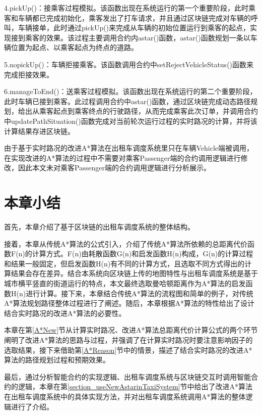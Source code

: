 4.pickUp()：接乘客过程模拟。该函数出现在系统运行的第一个重要阶段，此时乘客和车辆都已完成初始化，乘客发出了打车请求，并且通过区块链完成对车辆的呼叫，车辆接单，此时通过pickUp()来完成从车辆的初始位置运行到乘客的起点，实现接到乘客的效果。该过程主要调用合约内astar()函数，astar()函数规划一条以车辆位置为起点、以乘客起点为终点的道路。

5.nopickUp()：车辆拒接乘客。该函数调用合约中setRejectVehicleStatus()函数来完成拒接效果。

6.manageToEnd()：送乘客过程模拟。该函数出现在系统运行的第二个重要阶段，此时车辆已接到乘客。此过程调用合约中astar()函数，通过区块链完成动态路径规划，给出从乘客起点到乘客终点的行驶路径，从而完成乘客此次订单，并调用合约中updatePathSituation()函数完成对当前轮次运行过程的实时路况的计算，并将该计算结果存进区块链。

由于基于实时路况的改进A*算法在出租车调度系统里只在车辆Vehicle端被调用，在实现改进的A*算法的过程中不需要对乘客Passenger端的合约调用逻辑进行修改，因此本文未对乘客Passenger端的合约调用逻辑进行分析展示。

\section{本章小结}

首先，本章介绍了基于区块链的出租车调度系统的整体结构。

接着，本章从传统A*算法的公式引入，介绍了传统A*算法所依赖的总距离代价函数F(n)的计算方式。F(n)由耗散函数G(n)和启发函数H(n)构成，G(n)的计算过程和结果一般固定，但启发函数H(n)有不同的计算方式，且选取不同方式得出的计算结果会存在差异。结合本系统向区块链上传的地图特性与出租车调度系统是基于城市横平竖直的街道运行的特点，本文最终选取曼哈顿距离作为A*算法的启发函数H(n)进行计算。接下来，本章结合传统A*算法的流程图和简单的例子，对传统A*算法规划路径整体过程进行了阐述。随后，本章根据A*算法的特性给出了设计结合实时路况的改进A*算法的必要性。

本章在第\ref{A*New}节从计算实时路况、改进A*算法总距离代价计算公式的两个环节阐明了改进A*算法的思路与过程，并强调了在计算实时路况时要注意影响因子的选取结果，接下来借助第\ref{A*Reason}节中的情景，描述了结合实时路况的改进A*算法的路径规划过程和预期效果。

最后，通过分析智能合约的实现逻辑、出租车调度系统与区块链交互时调用智能合约的逻辑，本章在第\ref{section_useNewAstarinTaxiSystem}节中给出了改进A*算法在出租车调度系统中的具体实现方法，并对出租车调度系统调用A*算法的整体逻辑进行了介绍。